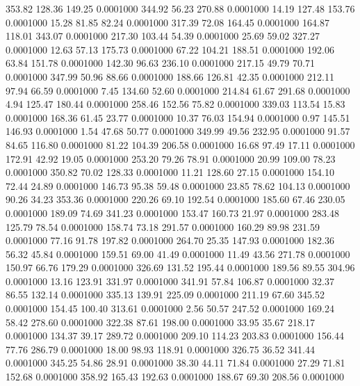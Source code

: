  353.82  128.36  149.25   0.0001000
 344.92   56.23  270.88   0.0001000
  14.19  127.48  153.76   0.0001000
  15.28   81.85   82.24   0.0001000
 317.39   72.08  164.45   0.0001000
 164.87  118.01  343.07   0.0001000
 217.30  103.44   54.39   0.0001000
  25.69   59.02  327.27   0.0001000
  12.63   57.13  175.73   0.0001000
  67.22  104.21  188.51   0.0001000
 192.06   63.84  151.78   0.0001000
 142.30   96.63  236.10   0.0001000
 217.15   49.79   70.71   0.0001000
 347.99   50.96   88.66   0.0001000
 188.66  126.81   42.35   0.0001000
 212.11   97.94   66.59   0.0001000
   7.45  134.60   52.60   0.0001000
 214.84   61.67  291.68   0.0001000
   4.94  125.47  180.44   0.0001000
 258.46  152.56   75.82   0.0001000
 339.03  113.54   15.83   0.0001000
 168.36   61.45   23.77   0.0001000
  10.37   76.03  154.94   0.0001000
   0.97  145.51  146.93   0.0001000
   1.54   47.68   50.77   0.0001000
 349.99   49.56  232.95   0.0001000
  91.57   84.65  116.80   0.0001000
  81.22  104.39  206.58   0.0001000
  16.68   97.49   17.11   0.0001000
 172.91   42.92   19.05   0.0001000
 253.20   79.26   78.91   0.0001000
  20.99  109.00   78.23   0.0001000
 350.82   70.02  128.33   0.0001000
  11.21  128.60   27.15   0.0001000
 154.10   72.44   24.89   0.0001000
 146.73   95.38   59.48   0.0001000
  23.85   78.62  104.13   0.0001000
  90.26   34.23  353.36   0.0001000
 220.26   69.10  192.54   0.0001000
 185.60   67.46  230.05   0.0001000
 189.09   74.69  341.23   0.0001000
 153.47  160.73   21.97   0.0001000
 283.48  125.79   78.54   0.0001000
 158.74   73.18  291.57   0.0001000
 160.29   89.98  231.59   0.0001000
  77.16   91.78  197.82   0.0001000
 264.70   25.35  147.93   0.0001000
 182.36   56.32   45.84   0.0001000
 159.51   69.00   41.49   0.0001000
  11.49   43.56  271.78   0.0001000
 150.97   66.76  179.29   0.0001000
 326.69  131.52  195.44   0.0001000
 189.56   89.55  304.96   0.0001000
  13.16  123.91  331.97   0.0001000
 341.91   57.84  106.87   0.0001000
  32.37   86.55  132.14   0.0001000
 335.13  139.91  225.09   0.0001000
 211.19   67.60  345.52   0.0001000
 154.45  100.40  313.61   0.0001000
   2.56   50.57  247.52   0.0001000
 169.24   58.42  278.60   0.0001000
 322.38   87.61  198.00   0.0001000
  33.95   35.67  218.17   0.0001000
 134.37   39.17  289.72   0.0001000
 209.10  114.23  203.83   0.0001000
 156.44   77.76  286.79   0.0001000
  18.00   98.93  118.91   0.0001000
 326.75   36.52  341.44   0.0001000
 345.25   54.86   28.91   0.0001000
  38.30   44.11   71.84   0.0001000
  27.29   71.81  152.68   0.0001000
 358.92  165.43  192.63   0.0001000
 188.67   69.30  208.56   0.0001000
